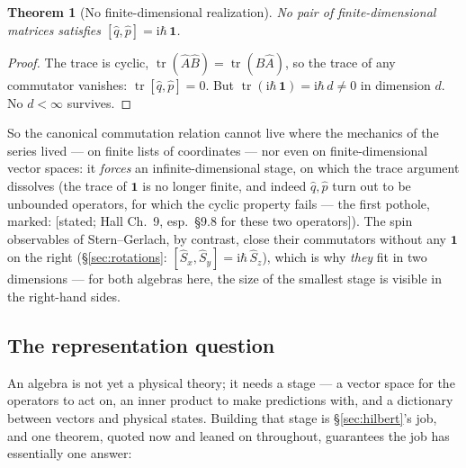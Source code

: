 \documentclass[11pt]{article}
\theoremstyle{plain}
\newtheorem{theorem}{Theorem}[section]
\theoremstyle{definition}
\theoremstyle{remark}
\newcommand{\ii}{\mathrm{i}}
\newcommand{\op}[1]{\hat{#1}}
\newcommand{\idop}{\mathbf{1}}  %
\begin{document}
\begin{theorem}[No finite-dimensional realization]
\label{thm:no-finite-dim}
No pair of finite-dimensional matrices satisfies
$[\op q, \op p] = \ii\hbar\,\idop$.
\end{theorem}

\begin{proof}
The trace is cyclic, $\operatorname{tr}(\op A\op B) =
\operatorname{tr}(\op B\op A)$, so the trace of any commutator
vanishes: $\operatorname{tr}[\op q, \op p] = 0$. But
$\operatorname{tr}(\ii\hbar\,\idop) = \ii\hbar\, d \ne 0$ in
dimension $d$. No $d < \infty$ survives.
\end{proof}

\noindent
So the canonical commutation relation cannot live where the
mechanics of the series lived --- on finite lists of coordinates ---
nor even on finite-dimensional vector spaces: it \emph{forces} an
infinite-dimensional stage, on which the trace argument dissolves
(the trace of $\idop$ is no longer finite, and indeed
$\op q, \op p$ turn out to be unbounded operators, for which the
cyclic property fails --- the first pothole, marked: [stated;
Hall Ch.\ 9, esp.\ \S9.8 for these two operators]). The spin observables of Stern--Gerlach, by contrast, close
their commutators without any $\idop$ on the right
(\S\ref{sec:rotations}: $[\op S_x, \op S_y] = \ii\hbar\,\op S_z$),
which is why \emph{they} fit in two dimensions --- for both algebras
here, the size of the smallest stage is visible in the right-hand
sides.

\subsection{The representation question}
\label{sec:representation-question}

An algebra is not yet a physical theory; it needs a stage --- a
vector space for the operators to act on, an inner product to make
predictions with, and a dictionary between vectors and physical
states. Building that stage is \S\ref{sec:hilbert}'s job, and one
theorem, quoted now and leaned on throughout, guarantees the job has
essentially one answer:
\end{document}
